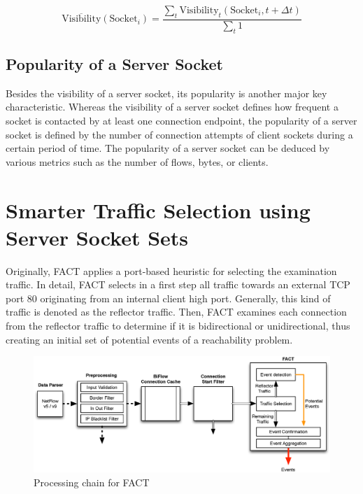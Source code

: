 \begin{equation}
	\overline{\text{Visibility}}(\text{Socket}_i) = \frac{\sum_{t} \text{Visibility}_t(\text{Socket}_i,t+\Delta{t})}{\sum_{t}1}
	\label{eq:visibility_avg}
\end{equation}

\subsection{Popularity of a Server Socket}

Besides the visibility of a \gls{server socket}, its popularity is another major key characteristic. 
Whereas the visibility of a \gls{server socket} defines how frequent a socket is contacted by at least one connection endpoint, the popularity of a \gls{server socket} is defined by the number of connection attempts of client sockets during a certain period of time. 
The popularity of a \gls{server socket} can be deduced by various metrics such as the number of flows, bytes, or clients.

\newpage
\section{Smarter Traffic Selection using Server Socket Sets 
\label{section:ses_traffic_selection}}

Originally, \gls{FACT} applies a port-based heuristic for selecting the  examination traffic.  
In detail, \gls{FACT} selects in a first step all traffic towards an external  \gls{TCP} port 80 originating from an internal client high port. 
Generally, this kind of traffic is denoted as the reflector traffic. 
Then, \gls{FACT} examines each connection from the reflector traffic to determine if it is  bidirectional or unidirectional, thus creating an initial set of potential events of a reachability problem. 

\begin{figure}
	[!b] \centering
	\includegraphics[width=\linewidth]{images/FACT.eps}
	\caption{Processing chain for FACT} 
	\label{fig:fact_chain} 
\end{figure}

